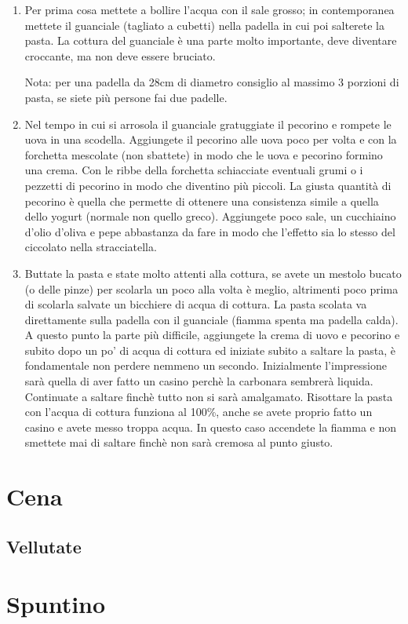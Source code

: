 \begin{enumerate}
\item Per prima cosa mettete a bollire l'acqua con il sale grosso; in contemporanea mettete il guanciale (tagliato a cubetti) nella padella in cui poi salterete la pasta. La cottura del guanciale è una parte molto importante, deve diventare croccante, ma non deve essere bruciato. %

Nota: per una padella da 28cm di diametro consiglio al massimo 3 porzioni di pasta, se siete più persone fai due padelle.

\item Nel tempo in cui si arrosola il guanciale gratuggiate il pecorino e rompete le uova in una scodella. Aggiungete il pecorino alle uova poco per volta e con la forchetta mescolate (non sbattete) in modo che le uova e pecorino formino una crema. Con le ribbe della forchetta schiacciate eventuali grumi o i pezzetti di pecorino in modo che diventino più piccoli. La giusta quantità di pecorino è quella che permette di ottenere una consistenza simile a quella dello yogurt (normale non quello greco).%
Aggiungete poco sale, un cucchiaino d'olio d'oliva e pepe abbastanza da fare in modo che l'effetto sia lo stesso del ciccolato nella stracciatella. %

\item Buttate la pasta e state molto attenti alla cottura, se avete un mestolo bucato (o delle pinze) per scolarla un poco alla volta è meglio, altrimenti poco prima di scolarla salvate un bicchiere di acqua di cottura. La pasta scolata va direttamente sulla padella con il guanciale (fiamma spenta ma padella calda). 
A questo punto la parte più difficile, aggiungete la crema di uovo e pecorino e subito dopo un po' di acqua di cottura ed iniziate subito a saltare la pasta, è fondamentale non perdere nemmeno un secondo.
Inizialmente l'impressione sarà quella di aver fatto un casino perchè la carbonara sembrerà liquida. Continuate a saltare finchè tutto non si sarà amalgamato.
Risottare la pasta con l'acqua di cottura funziona al 100\%, anche se avete proprio fatto un casino e avete messo troppa acqua. In questo caso accendete la fiamma e non smettete mai di saltare finchè non sarà cremosa al punto giusto. 

\end{enumerate}

\chapter{Cena}

\section{Vellutate}

\chapter{Spuntino}

\pagebreak
